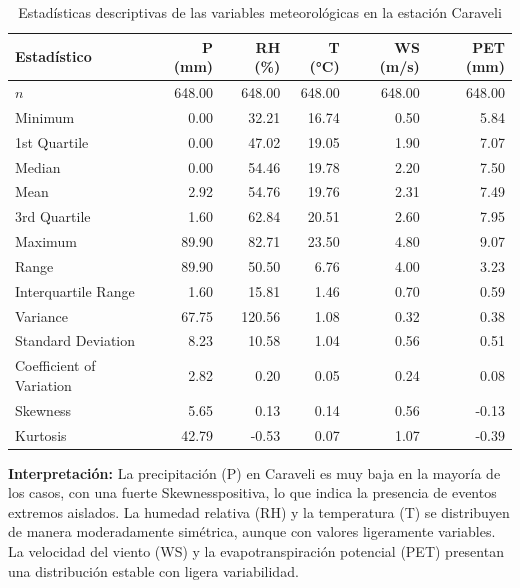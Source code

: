\begin{table}[H]
\centering
\caption{Estadísticas descriptivas de las variables meteorológicas en la estación Caraveli}
\label{tab:stat_caraveli}
\tiny
\begin{tabular}{lrrrrr}
\toprule
\textbf{Estadístico} & \textbf{P (mm)} & \textbf{RH (\%)} & \textbf{T (°C)} & \textbf{WS (m/s)} & \textbf{PET (mm)} \\
\midrule
$n$    & 648.00 & 648.00 & 648.00 & 648.00 & 648.00 \\
Minimum                 & 0.00   & 32.21  & 16.74  & 0.50   & 5.84   \\
1st Quartile          & 0.00   & 47.02  & 19.05  & 1.90   & 7.07   \\
Median               & 0.00   & 54.46  & 19.78  & 2.20   & 7.50   \\
Mean                 & 2.92   & 54.76  & 19.76  & 2.31   & 7.49   \\
3rd Quartile           & 1.60   & 62.84  & 20.51  & 2.60   & 7.95   \\
Maximum                & 89.90  & 82.71  & 23.50  & 4.80   & 9.07   \\
Range                 & 89.90  & 50.50  & 6.76   & 4.00   & 3.23   \\
Interquartile Range  & 1.60   & 15.81  & 1.46   & 0.70   & 0.59   \\
Variance            & 67.75  & 120.56 & 1.08   & 0.32   & 0.38   \\
Standard Deviation          & 8.23   & 10.58  & 1.04   & 0.56   & 0.51   \\
Coefficient of Variation      & 2.82   & 0.20   & 0.05   & 0.24   & 0.08   \\
Skewness            & 5.65   & 0.13   & 0.14   & 0.56   & -0.13  \\
Kurtosis              & 42.79  & -0.53  & 0.07   & 1.07   & -0.39  \\
\bottomrule
\end{tabular}
\end{table}

\textbf{Interpretación:} La precipitación (P) en Caraveli es muy baja en la mayoría de los casos, con una fuerte Skewnesspositiva, lo que indica la presencia de eventos extremos aislados. La humedad relativa (RH) y la temperatura (T) se distribuyen de manera moderadamente simétrica, aunque con valores ligeramente variables. La velocidad del viento (WS) y la evapotranspiración potencial (PET) presentan una distribución estable con ligera variabilidad.

